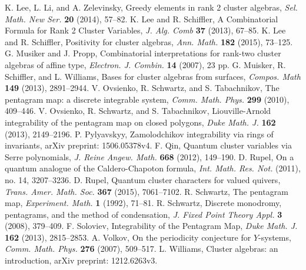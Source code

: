 \documentclass{amsart}
\theoremstyle{definition}
\theoremstyle{remark}
\numberwithin{equation}{section}
\begin{document}
\begin{thebibliography}{99}
   K. Lee, L. Li, and A. Zelevinsky, Greedy elements in rank 2 cluster algebras, \textsl{Sel. Math. New Ser.} \textbf{20} (2014), 57--82.
   K. Lee and R. Schiffler, A Combinatorial Formula for Rank 2 Cluster Variables, \textsl{J. Alg. Comb} \textbf{37} (2013), 67--85.
   K. Lee and R. Schiffler, Positivity for cluster algebras, \textsl{Ann. Math.} \textbf{182} (2015), 73--125.
	 G. Musiker and J. Propp, Combinatorial interpretations for rank-two cluster algebras of affine type, \textsl{ Electron. J. Combin.} \textbf{14} (2007), 23 pp.
	 G. Muisker, R. Schiffler, and L. Williams, Bases for cluster algebras from surfaces, \textsl{Compos. Math} \textbf{149} (2013), 2891--2944.
	 V. Ovsienko, R. Schwartz, and S. Tabachnikov, The pentagram map: a discrete integrable system, \textsl{Comm. Math. Phys.} \textbf{299} (2010), 409--446.
	 V. Ovsienko, R. Schwartz, and S. Tabachnikov, Liouville-Arnold integrability of the pentagram map on closed polygons, \textsl{Duke Math. J.} \textbf{162} (2013), 2149--2196.
   P. Pylyavskyy, Zamolodchikov integrability via rings of invariants, arXiv preprint: 1506.05378v4.
	 F. Qin, Quantum cluster variables via Serre polynomials, \textsl{J. Reine Angew. Math.} \textbf{668} (2012), 149--190.
   D. Rupel, On a quantum analogue of the Caldero-Chapoton formula, \textsl{Int. Math. Res. Not.} (2011), no. 14, 3207--3236.
   D. Rupel, Quantum cluster characters for valued quivers, \textsl{Trans. Amer. Math. Soc.} \textbf{367} (2015), 7061--7102.
	 R. Schwartz, The pentagram map, \textsl{Experiment. Math.} \textbf{1} (1992), 71--81.
	 R. Schwartz, Discrete monodromy, pentagrams, and the method of condensation, \textsl{J. Fixed Point Theory Appl.} \textbf{3} (2008), 379--409.
	 F. Soloviev, Integrability of the Pentagram Map, \textsl{Duke Math. J.} \textbf{162} (2013), 2815--2853.
	 A. Volkov, On the periodicity conjecture for $Y$-systems, \textsl{Comm. Math. Phys.} \textbf{276} (2007), 509--517.
   L. Williams, Cluster algebras: an introduction, arXiv preprint: 1212.6263v3.
\end{thebibliography}
\end{document}
